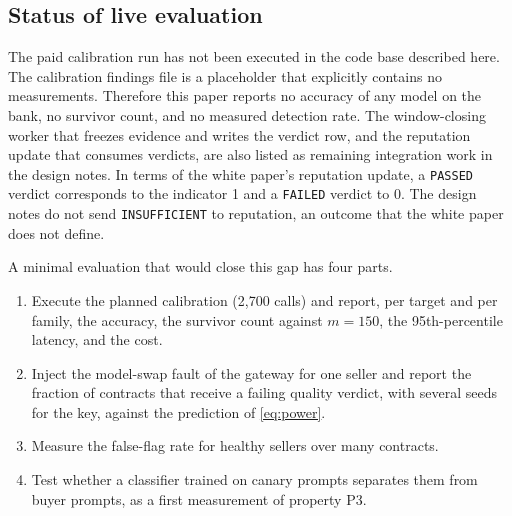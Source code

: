 \subsection{Status of live evaluation}
\label{sec:status}

The paid calibration run has not been executed in the code base described
here. The calibration findings file is a placeholder that explicitly contains
no measurements. Therefore this paper reports no accuracy of any model on the
bank, no survivor count, and no measured detection rate. The window-closing
worker that freezes evidence and writes the verdict row, and the reputation
update that consumes verdicts, are also listed as remaining integration work in
the design notes. In terms of the white paper's reputation update, a
\texttt{PASSED} verdict corresponds to the indicator 1 and a
\texttt{FAILED} verdict to 0. The design notes do not send
\texttt{INSUFFICIENT} to reputation, an outcome that the white paper does
not define.

A minimal evaluation that would close this gap has four parts.
\begin{enumerate}
  \item Execute the planned calibration (2,700 calls) and report, per target
    and per family, the accuracy, the survivor count against $m = 150$, the
    95th-percentile latency, and the cost.
  \item Inject the model-swap fault of the gateway for one seller and report
    the fraction of contracts that receive a failing quality verdict, with
    several seeds for the key, against the prediction of \eqref{eq:power}.
  \item Measure the false-flag rate for healthy sellers over many contracts.
  \item Test whether a classifier trained on canary prompts separates them from
    buyer prompts, as a first measurement of property P3.
\end{enumerate}
